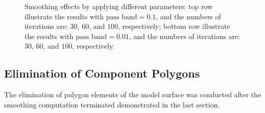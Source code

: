 \begin{figure}[t]
{\label{fig:Smooth100-1}}
\hfil
{}
\hfil
{}
\hfil
{}
\caption{Smoothing effects by applying different parameters: top row illustrate the results with $\text{pass band} = 0.1$, and the numbers of iterations are: $30$, $60$, and $100$, respectively; bottom row illustrate the results with $\text{pass band} = 0.01$, and the numbers of iterations are: $30$, $60$, and $100$, respectively.}%
\label{fig:Smooth}
\end{figure}

\subsection{Elimination of Component Polygons}

The elimination of polygon elements of the model surface was conducted after the smoothing computation terminated demonstrated in the last section.

